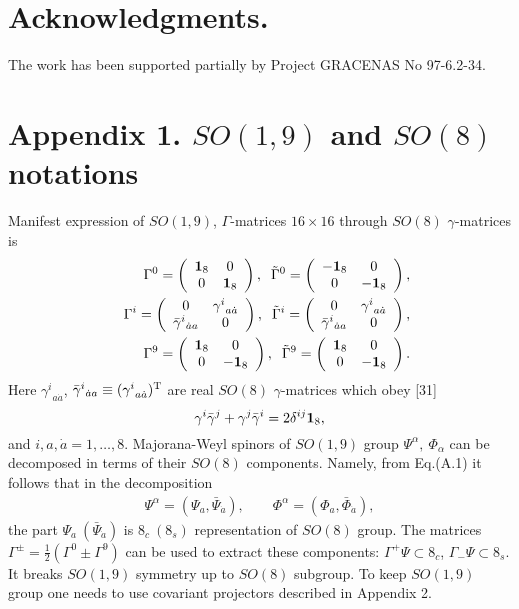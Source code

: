 \documentclass[a4paper]{article}
\begin{document}
\section*{Acknowledgments.}

The work has been supported partially by Project GRACENAS No 97-6.2-34.
 
\section*{Appendix 1. $SO(1, 9)$ and $SO(8)$ notations}
\setcounter{equation}{0}
\def\theequation{A.\arabic{equation}}
Manifest expression of $SO(1, 9)$, $\Gamma$-matrices $16\times16$ 
through $SO(8)$ $\gamma$-matrices is
\begin{eqnarray}
&& \Gamma^0=\left(\begin{array}{cc} {\bf 1}_8 & 0\\
0 & {\bf 1}_8\end{array}\right),\;\;
 \tilde\Gamma^0=\left(\begin{array}{cc} -{\bf 1}_8 & 0\\
0 & -{\bf 1}_8\end{array}\right),\cr
&& \Gamma^i=\left(\begin{array}{cc} 0 & {\gamma^i}_{a\dot a}\\
\bar\gamma^i{}_{\dot aa} & 0 \end{array}\right), \;\;
 \tilde\Gamma^i=\left(\begin{array}{cc} 0 & {\gamma^i}_{a\dot a}\\
\bar\gamma^i{}_{\dot aa} & 0\end{array}\right),\cr
&& \Gamma^9=\left(\begin{array}{cc} {\bf 1}_8 & 0\\
0 & -{\bf 1}_8\end{array}\right), \;\;
 \tilde\Gamma^9=\left(\begin{array}{cc} {\bf 1}_8 & 0\\
0 & -{\bf 1}_8\end{array}\right).
\end{eqnarray}
Here ${\gamma^i}_{a\dot a}$, $\bar\gamma^i{}_{\dot aa}\equiv
({\gamma^i}_{a\dot a})^{\rm T}$ are real $SO(8)$ $\gamma$-matrices
which obey [31]
\begin{equation}
\gamma^i\bar\gamma^j+\gamma^j\bar\gamma^i=2\delta^{ij}{\bf 1}_8,
\end{equation}
and $i,a,\dot a=1,\dots,8$. Majorana-Weyl spinors of $SO(1, 9)$ group 
$\Psi^\alpha, ~ \Phi_\alpha$ can be decomposed in terms of their 
$SO(8)$ components. Namely, from Eq.(A.1) it follows that in the 
decomposition 
\begin{eqnarray}
\Psi^\alpha=(\Psi_a, \bar\Psi_{\dot a}), \qquad 
\Phi^\alpha=(\Phi_a, \bar\Phi_{\dot a}),
\end{eqnarray}
the part $\Psi_a ~ (\bar\Psi_{\dot a})$ is $8_c ~ (8_s)$ 
representation of 
$SO(8)$ group. The matrices $\Gamma^{\pm}=\frac 12 (\Gamma^0\pm\Gamma^9)$ 
can be used to extract these components: $\Gamma^+\Psi\subset 8_c$, 
$\Gamma_-\Psi\subset 8_s$. It breaks $SO(1, 9)$ symmetry up to $SO(8)$ 
subgroup. To keep $SO(1, 9)$ group one needs to use covariant projectors 
described in Appendix 2. 
\end{document}

